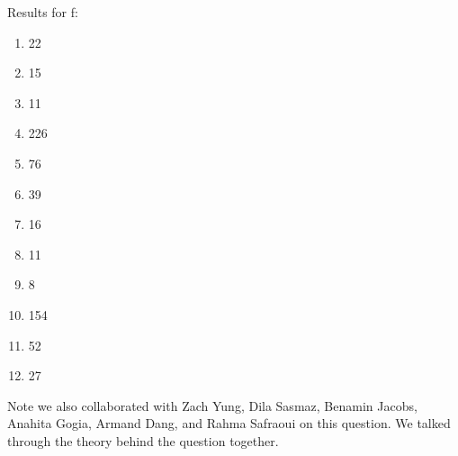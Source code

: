 \documentclass[
  12pt,
  landscape]{article}
\begin{document}
Results for f:

\begin{enumerate}
\def\labelenumi{\arabic{enumi})}
\item
  22
\item
  15
\item
  11
\item
  226
\item
  76
\item
  39
\item
  16
\item
  11
\item
  8
\item
  154
\item
  52
\item
  27
\end{enumerate}

Note we also collaborated with Zach Yung, Dila Sasmaz, Benamin Jacobs,
Anahita Gogia, Armand Dang, and Rahma Safraoui on this question. We
talked through the theory behind the question together.
\end{document}
